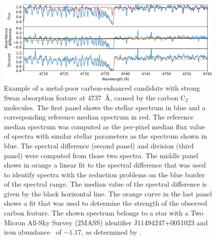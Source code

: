 \begin{figure}
	\centering
	\includegraphics[width=\textwidth]{cemp_cand_150412003601009.png}
	\caption{Example of a metal-poor carbon-enhanced candidate with strong Swan absorption feature at 4737~\AA, caused by the carbon C$_2$ molecules. The first panel shows the stellar spectrum in blue and a corresponding reference median spectrum in red. The reference median spectrum was computed as the per-pixel median flux value of spectra with similar stellar parameters as the spectrum shown in blue. The spectral difference (second panel) and division (third panel) were computed from those two spectra. The middle panel shows in orange a linear fit to the spectral difference that was used to identify spectra with the reduction problems on the blue border of the spectral range. The median value of the spectral difference is given by the black horizontal line. The orange curve in the last panel shows a fit that was used to determine the strength of the observed carbon feature. The shown spectrum belongs to a star with a Two Micron All-Sky Survey (2MASS) identifier J11494247+0051023 and iron abundance \Feh\ of $-1.17$, as determined by \TC.}
	\label{fig:carbon_example}
\end{figure}

